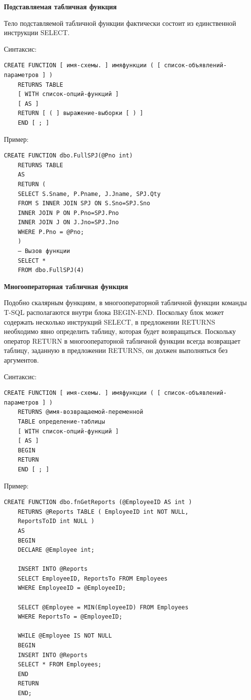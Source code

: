 \textbf{Подставляемая табличная функция}

Тело подставляемой табличной функции фактически состоит из единственной инструкции
SELECT.

Синтаксис:
\begin{lstlisting}[label=podstfuncsint]
	CREATE FUNCTION [ имя-схемы. ] имяфункции ( [ список-объявлений-параметров ] )
	RETURNS TABLE
	[ WITH список-опций-функций ]
	[ AS ]
	RETURN [ ( ] выражение-выборки [ ) ]
	END [ ; ] 
\end{lstlisting}
Пример:
\begin{lstlisting}[label=podstfuncexample]
	CREATE FUNCTION dbo.FullSPJ(@Pno int)
	RETURNS TABLE
	AS
	RETURN (
	SELECT S.Sname, P.Pname, J.Jname, SPJ.Qty
	FROM S INNER JOIN SPJ ON S.Sno=SPJ.Sno
	INNER JOIN P ON P.Pno=SPJ.Pno
	INNER JOIN J ON J.Jno=SPJ.Jno
	WHERE P.Pno = @Pno;
	)
	— Вызов функции
	SELECT *
	FROM dbo.FullSPJ(4)
\end{lstlisting}

\textbf{Многооператорная табличная функция}

Подобно скалярным функциям, в многооператорной табличной функции команды T-SQL
располагаются внутри блока BEGIN-END. Поскольку блок может содержать несколько
инструкций SELECT, в предложении RETURNS необходимо явно определить таблицу,
которая будет возвращаться. Поскольку оператор RETURN в многооператорной табличной
функции всегда возвращает таблицу, заданную в предложении RETURNS, он должен
выполняться без аргументов.

Синтаксис:
\begin{lstlisting}[label=mnogfuncsint]
	CREATE FUNCTION [ имя-схемы. ] имяфункции ( [ список-объявлений-параметров ] )
	RETURNS @имя-возвращаемой-переменной
	TABLE определение-таблицы
	[ WITH список-опций-функций ]
	[ AS ]
	BEGIN
	RETURN
	END [ ; ] 
\end{lstlisting}
Пример:
\begin{lstlisting}[label=mnogfuncexample]
	CREATE FUNCTION dbo.fnGetReports (@EmployeeID AS int )
	RETURNS @Reports TABLE ( EmployeeID int NOT NULL,
	ReportsToID int NULL )
	AS
	BEGIN
	DECLARE @Employee int;
	
	INSERT INTO @Reports
	SELECT EmployeeID, ReportsTo FROM Employees
	WHERE EmployeeID = @EmployeeID;
	
	SELECT @Employee = MIN(EmployeeID) FROM Employees
	WHERE ReportsTo = @EmployeeID;
	
	WHILE @Employee IS NOT NULL
	BEGIN
	INSERT INTO @Reports
	SELECT * FROM Employees;
	END
	RETURN
	END; 
\end{lstlisting}

